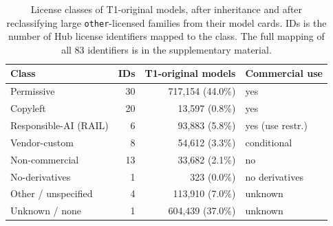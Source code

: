 \begin{table}[t]
\centering
\footnotesize
\setlength{\tabcolsep}{4pt}
\caption{License classes of T1-original models, after inheritance and after reclassifying large \texttt{other}-licensed families from their model cards. IDs is the number of Hub license identifiers mapped to the class. The full mapping of all 83 identifiers is in the supplementary material.}
\label{tab:licenses}
\begin{tabular}{lrrl}
\toprule
Class & IDs & T1-original models & Commercial use \\
\midrule
Permissive & 30 & 717,154 (44.0\%) & yes \\
Copyleft & 20 & 13,597 (0.8\%) & yes \\
Responsible-AI (RAIL) & 6 & 93,883 (5.8\%) & yes (use restr.) \\
Vendor-custom & 8 & 54,612 (3.3\%) & conditional \\
Non-commercial & 13 & 33,682 (2.1\%) & no \\
No-derivatives & 1 & 323 (0.0\%) & no derivatives \\
Other / unspecified & 4 & 113,910 (7.0\%) & unknown \\
Unknown / none & 1 & 604,439 (37.0\%) & unknown \\
\bottomrule
\end{tabular}
\end{table}
